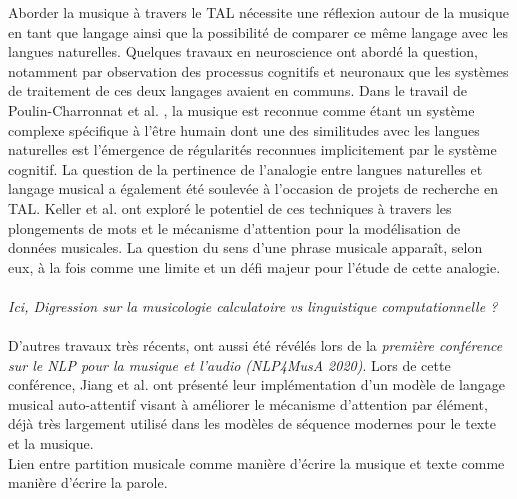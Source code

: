 Aborder la musique à travers le TAL nécessite une réflexion autour de la musique en tant que langage ainsi que la possibilité de comparer ce même langage avec les langues naturelles. Quelques travaux en neuroscience ont abordé la question, notamment par observation des processus cognitifs et neuronaux que les systèmes de traitement de ces deux langages avaient en communs. Dans le travail de Poulin-Charronnat et al. \cite{poulincharronnat:hal-01985213}, la musique est reconnue comme étant un système complexe spécifique à l’être humain dont une des similitudes avec les langues naturelles est l’émergence de régularités reconnues implicitement par le système cognitif. La question de la pertinence de l’analogie entre langues naturelles et langage musical a également été soulevée à l’occasion de projets de recherche en TAL. Keller et al. \cite{keller:hal-03279850} ont exploré le potentiel de ces techniques à travers les plongements de mots et le mécanisme d’attention pour la modélisation de données musicales. La question du sens d’une phrase musicale apparaît, selon eux, à la fois comme une limite et un défi majeur pour l’étude de cette analogie.\\\\
\textit{Ici, Digression sur la musicologie calculatoire vs linguistique computationnelle ?}\\\\
D’autres travaux très récents, ont aussi été révélés lors de la \textit{première conférence sur le NLP pour la musique et l'audio (NLP4MusA 2020)}. Lors de cette conférence, Jiang et al. \cite{Jiang2020DiscoveringMR} ont présenté leur implémentation d’un modèle de langage musical auto-attentif visant à améliorer le mécanisme d'attention par élément, déjà très largement utilisé dans les modèles de séquence modernes pour le texte et la musique.\\
Lien entre partition musicale comme manière d’écrire la musique et texte comme manière d’écrire la parole.
